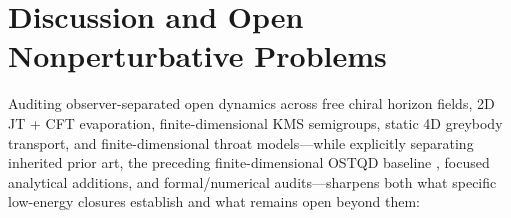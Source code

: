 \documentclass[11pt,a4paper]{article}
\theoremstyle{definition}
\theoremstyle{remark}
\newcommand{\1}{\mathbf{1}}
\begin{document}
\section{Discussion and Open Nonperturbative Problems}\label{sec:discussion}

Auditing observer-separated open dynamics across free chiral horizon fields, 2D JT + CFT evaporation, finite-dimensional KMS semigroups, static 4D greybody transport, and finite-dimensional throat models---while explicitly separating inherited prior art, the preceding finite-dimensional OSTQD baseline \cite{Soga2026OSTQD}, focused analytical additions, and formal/numerical audits---sharpens both what specific low-energy closures establish and what remains open beyond them:
\end{document}
